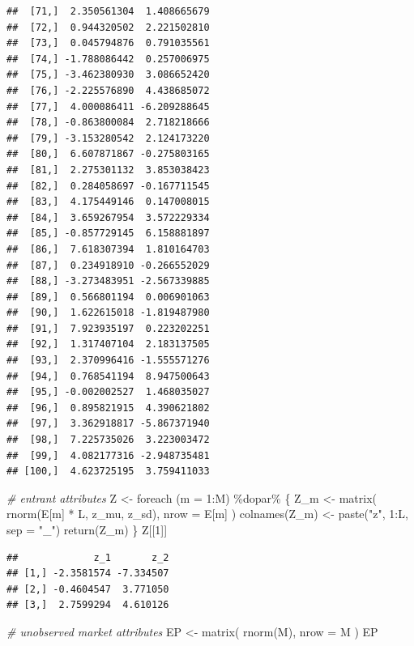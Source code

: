 \documentclass[
]{book}
\newenvironment{Shaded}{\begin{snugshade}}{\end{snugshade}}
\newcommand{\AttributeTok}[1]{\textcolor[rgb]{0.77,0.63,0.00}{#1}}
\newcommand{\CommentTok}[1]{\textcolor[rgb]{0.56,0.35,0.01}{\textit{#1}}}
\newcommand{\DecValTok}[1]{\textcolor[rgb]{0.00,0.00,0.81}{#1}}
\newcommand{\FunctionTok}[1]{\textcolor[rgb]{0.00,0.00,0.00}{#1}}
\newcommand{\NormalTok}[1]{#1}
\newcommand{\OtherTok}[1]{\textcolor[rgb]{0.56,0.35,0.01}{#1}}
\newcommand{\SpecialCharTok}[1]{\textcolor[rgb]{0.00,0.00,0.00}{#1}}
\newcommand{\StringTok}[1]{\textcolor[rgb]{0.31,0.60,0.02}{#1}}
\begin{document}
\begin{verbatim}
##  [71,]  2.350561304  1.408665679
##  [72,]  0.944320502  2.221502810
##  [73,]  0.045794876  0.791035561
##  [74,] -1.788086442  0.257006975
##  [75,] -3.462380930  3.086652420
##  [76,] -2.225576890  4.438685072
##  [77,]  4.000086411 -6.209288645
##  [78,] -0.863800084  2.718218666
##  [79,] -3.153280542  2.124173220
##  [80,]  6.607871867 -0.275803165
##  [81,]  2.275301132  3.853038423
##  [82,]  0.284058697 -0.167711545
##  [83,]  4.175449146  0.147008015
##  [84,]  3.659267954  3.572229334
##  [85,] -0.857729145  6.158881897
##  [86,]  7.618307394  1.810164703
##  [87,]  0.234918910 -0.266552029
##  [88,] -3.273483951 -2.567339885
##  [89,]  0.566801194  0.006901063
##  [90,]  1.622615018 -1.819487980
##  [91,]  7.923935197  0.223202251
##  [92,]  1.317407104  2.183137505
##  [93,]  2.370996416 -1.555571276
##  [94,]  0.768541194  8.947500643
##  [95,] -0.002002527  1.468035027
##  [96,]  0.895821915  4.390621802
##  [97,]  3.362918817 -5.867371940
##  [98,]  7.225735026  3.223003472
##  [99,]  4.082177316 -2.948735481
## [100,]  4.623725195  3.759411033
\end{verbatim}

\begin{Shaded}
\begin{Highlighting}[]
\CommentTok{\# entrant attributes}
\NormalTok{Z }\OtherTok{\textless{}{-}}
  \FunctionTok{foreach}\NormalTok{ (}\AttributeTok{m =} \DecValTok{1}\SpecialCharTok{:}\NormalTok{M) }\SpecialCharTok{\%dopar\%}\NormalTok{ \{}
\NormalTok{    Z\_m }\OtherTok{\textless{}{-}} \FunctionTok{matrix}\NormalTok{(}
      \FunctionTok{rnorm}\NormalTok{(E[m] }\SpecialCharTok{*}\NormalTok{ L, z\_mu, z\_sd),}
      \AttributeTok{nrow =}\NormalTok{ E[m]}
\NormalTok{    )}
    \FunctionTok{colnames}\NormalTok{(Z\_m) }\OtherTok{\textless{}{-}} \FunctionTok{paste}\NormalTok{(}\StringTok{"z"}\NormalTok{, }\DecValTok{1}\SpecialCharTok{:}\NormalTok{L, }\AttributeTok{sep =} \StringTok{"\_"}\NormalTok{)}
    \FunctionTok{return}\NormalTok{(Z\_m)}
\NormalTok{  \}}
\NormalTok{Z[[}\DecValTok{1}\NormalTok{]]}
\end{Highlighting}
\end{Shaded}

\begin{verbatim}
##             z_1       z_2
## [1,] -2.3581574 -7.334507
## [2,] -0.4604547  3.771050
## [3,]  2.7599294  4.610126
\end{verbatim}

\begin{Shaded}
\begin{Highlighting}[]
\CommentTok{\# unobserved market attributes}
\NormalTok{EP }\OtherTok{\textless{}{-}} \FunctionTok{matrix}\NormalTok{(}
  \FunctionTok{rnorm}\NormalTok{(M),}
  \AttributeTok{nrow =}\NormalTok{ M}
\NormalTok{)}
\NormalTok{EP}
\end{Highlighting}
\end{Shaded}
\end{document}
